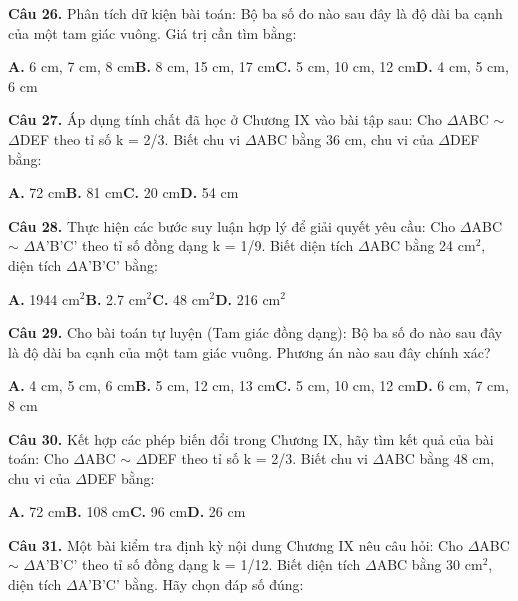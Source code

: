 \documentclass[11pt,a4paper]{article}
\begin{document}
\textbf{\color{primary} Câu 26.} Phân tích dữ kiện bài toán: Bộ ba số đo nào sau đây là độ dài ba cạnh của một tam giác vuông. Giá trị cần tìm bằng:\par
\hspace*{1.5em}\textbf{A.} 6 cm, 7 cm, 8 cm\quad\quad \textbf{B.} 8 cm, 15 cm, 17 cm\quad\quad \textbf{C.} 5 cm, 10 cm, 12 cm\quad\quad \textbf{D.} 4 cm, 5 cm, 6 cm\par\vspace{2pt}
\textbf{\color{primary} Câu 27.} Áp dụng tính chất đã học ở Chương IX vào bài tập sau: Cho $\Delta$ABC $\sim$ $\Delta$DEF theo tỉ số k = 2/3. Biết chu vi $\Delta$ABC bằng 36 cm, chu vi của $\Delta$DEF bằng:\par
\hspace*{1.5em}\textbf{A.} 72 cm\quad\quad \textbf{B.} 81 cm\quad\quad \textbf{C.} 20 cm\quad\quad \textbf{D.} 54 cm\par\vspace{2pt}
\textbf{\color{primary} Câu 28.} Thực hiện các bước suy luận hợp lý để giải quyết yêu cầu: Cho $\Delta$ABC $\sim$ $\Delta$A'B'C' theo tỉ số đồng dạng k = 1/9. Biết diện tích $\Delta$ABC bằng 24 cm$^2$, diện tích $\Delta$A'B'C' bằng:\par
\hspace*{1.5em}\textbf{A.} 1944 cm$^2$\quad\quad \textbf{B.} 2.7 cm$^2$\quad\quad \textbf{C.} 48 cm$^2$\quad\quad \textbf{D.} 216 cm$^2$\par\vspace{2pt}
\textbf{\color{primary} Câu 29.} Cho bài toán tự luyện (Tam giác đồng dạng): Bộ ba số đo nào sau đây là độ dài ba cạnh của một tam giác vuông. Phương án nào sau đây chính xác?\par
\hspace*{1.5em}\textbf{A.} 4 cm, 5 cm, 6 cm\quad\quad \textbf{B.} 5 cm, 12 cm, 13 cm\quad\quad \textbf{C.} 5 cm, 10 cm, 12 cm\quad\quad \textbf{D.} 6 cm, 7 cm, 8 cm\par\vspace{2pt}
\textbf{\color{primary} Câu 30.} Kết hợp các phép biến đổi trong Chương IX, hãy tìm kết quả của bài toán: Cho $\Delta$ABC $\sim$ $\Delta$DEF theo tỉ số k = 2/3. Biết chu vi $\Delta$ABC bằng 48 cm, chu vi của $\Delta$DEF bằng:\par
\hspace*{1.5em}\textbf{A.} 72 cm\quad\quad \textbf{B.} 108 cm\quad\quad \textbf{C.} 96 cm\quad\quad \textbf{D.} 26 cm\par\vspace{2pt}
\textbf{\color{primary} Câu 31.} Một bài kiểm tra định kỳ nội dung Chương IX nêu câu hỏi: Cho $\Delta$ABC $\sim$ $\Delta$A'B'C' theo tỉ số đồng dạng k = 1/12. Biết diện tích $\Delta$ABC bằng 30 cm$^2$, diện tích $\Delta$A'B'C' bằng. Hãy chọn đáp số đúng:\par
\end{document}
